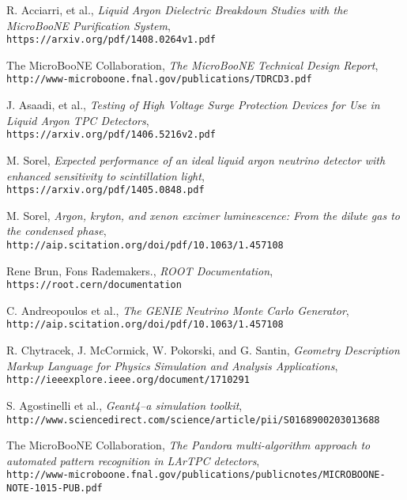\documentclass[12pt]{article}
\begin{document}
\begin{thebibliography}{20}
  R. Acciarri, et al., \emph{Liquid Argon Dielectric Breakdown Studies with the MicroBooNE Purification System}, \\
  \texttt{https://arxiv.org/pdf/1408.0264v1.pdf}

  The MicroBooNE Collaboration, \emph{The MicroBooNE Technical Design Report}, \\
  \texttt{http://www-microboone.fnal.gov/publications/TDRCD3.pdf}

  J. Asaadi, et al., \emph{Testing of High Voltage Surge Protection Devices for Use in Liquid Argon TPC Detectors}, \\
  \texttt{https://arxiv.org/pdf/1406.5216v2.pdf}

  M. Sorel, \emph{Expected performance of an ideal liquid argon neutrino detector with enhanced sensitivity to scintillation light}, \\
  \texttt{https://arxiv.org/pdf/1405.0848.pdf}

  M. Sorel, \emph{Argon, kryton, and xenon excimer luminescence: From the dilute gas to the condensed phase}, \\
  \texttt{http://aip.scitation.org/doi/pdf/10.1063/1.457108}

  Rene Brun, Fons Rademakers., \emph{ROOT Documentation}, \\
  \texttt{https://root.cern/documentation}

  C. Andreopoulos et al., \emph{The GENIE Neutrino Monte Carlo Generator}, \\
  \texttt{http://aip.scitation.org/doi/pdf/10.1063/1.457108}

  R. Chytracek, J. McCormick, W. Pokorski, and G. Santin, \emph{Geometry Description Markup Language for Physics Simulation and Analysis Applications}, \\
  \texttt{http://ieeexplore.ieee.org/document/1710291}

  S. Agostinelli et al., \emph{Geant4--a simulation toolkit},\\
  \texttt{http://www.sciencedirect.com/science/article/pii/S0168900203013688}

  The MicroBooNE Collaboration, \emph{The Pandora multi-algorithm approach to automated pattern recognition in LArTPC detectors},\\
  \texttt{http://www-microboone.fnal.gov/publications/publicnotes/MICROBOONE-NOTE-1015-PUB.pdf}


\end{thebibliography}
\end{document}

